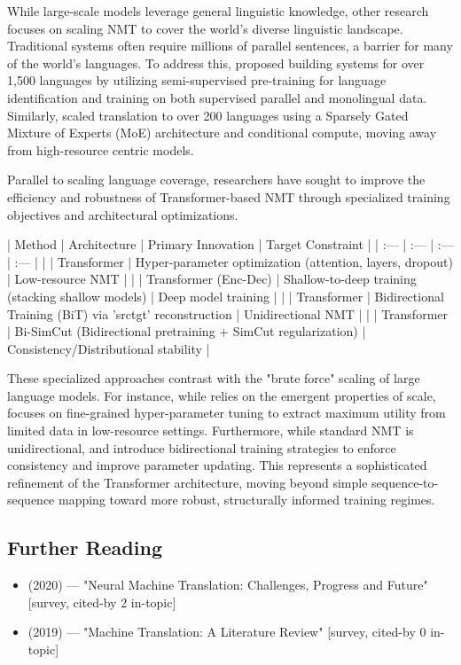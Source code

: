 \documentclass[11pt]{article}
\begin{document}
While large-scale models leverage general linguistic knowledge, other research focuses on scaling NMT to cover the world's diverse linguistic landscape. Traditional systems often require millions of parallel sentences, a barrier for many of the world's languages. To address this, \citep{2205.03983} proposed building systems for over 1,500 languages by utilizing semi-supervised pre-training for language identification and training on both supervised parallel and monolingual data. Similarly, \citep{2207.04672} scaled translation to over 200 languages using a Sparsely Gated Mixture of Experts (MoE) architecture and conditional compute, moving away from high-resource centric models.

Parallel to scaling language coverage, researchers have sought to improve the efficiency and robustness of Transformer-based NMT through specialized training objectives and architectural optimizations.

| Method | Architecture | Primary Innovation | Target Constraint |
| :--- | :--- | :--- | :--- |
| \citep{2011.02266} | Transformer | Hyper-parameter optimization (attention, layers, dropout) | Low-resource NMT |
| \citep{2010.03737} | Transformer (Enc-Dec) | Shallow-to-deep training (stacking shallow models) | Deep model training |
| \citep{2109.07780} | Transformer | Bidirectional Training (BiT) via 'srctgt' reconstruction | Unidirectional NMT |
| \citep{2206.02368} | Transformer | Bi-SimCut (Bidirectional pretraining + SimCut regularization) | Consistency/Distributional stability |

These specialized approaches contrast with the "brute force" scaling of large language models. For instance, while \citep{2005.14165} relies on the emergent properties of scale, \citep{2011.02266} focuses on fine-grained hyper-parameter tuning to extract maximum utility from limited data in low-resource settings. Furthermore, while standard NMT is unidirectional, \citep{2109.07780} and \citep{2206.02368} introduce bidirectional training strategies to enforce consistency and improve parameter updating. This represents a sophisticated refinement of the Transformer architecture, moving beyond simple sequence-to-sequence mapping toward more robust, structurally informed training regimes.
\subsection{Further Reading}

\begin{itemize}
  \item \citep{2004.05809} (2020) — "Neural Machine Translation: Challenges, Progress and Future" [survey, cited-by 2 in-topic]
  \item \citep{1901.01122} (2019) — "Machine Translation: A Literature Review" [survey, cited-by 0 in-topic]
\end{itemize}
\end{document}
